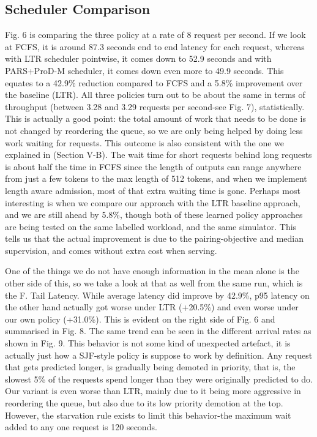 \documentclass[conference]{IEEEtran}
\begin{document}
\subsection{Scheduler Comparison}
\label{sec:comparison}
Fig. 6 is comparing the three policy at a rate of 8 request per second. If we look at FCFS, it is around 87.3 seconds end to end latency for each request, whereas with LTR scheduler pointwise, it comes down to 52.9 seconds and with PARS+ProD-M scheduler, it comes down even more to 49.9 seconds. This equates to a 42.9\% reduction compared to FCFS and a 5.8\% improvement over the baseline (LTR). All three policies turn out to be about the same in terms of throughput (between 3.28 and 3.29 requests per second-see Fig. 7), statistically. This is actually a good point: the total amount of work that needs to be done is not changed by reordering the queue, so we are only being helped by doing less work waiting for requests. This outcome is also consistent with the one we explained in (Section V-B). The wait time for short requests behind long requests is about half the time in FCFS since the length of outputs can range anywhere from just a few tokens to the max length of 512 tokens, and when we implement length aware admission, most of that extra waiting time is gone. Perhaps most interesting is when we compare our approach with the LTR baseline approach, and we are still ahead by 5.8\%, though both of these learned policy approaches are being tested on the same labelled workload, and the same simulator. This tells us that the actual improvement is due to the pairing-objective and median supervision, and comes without extra cost when serving.

One of the things we do not have enough information in the mean alone is the other side of this, so we take a look at that as well from the same run, which is the F. Tail Latency. While average latency did improve by 42.9\%, p95 latency on the other hand actually got worse under LTR (+20.5\%) and even worse under our own policy (+31.0\%). This is evident on the right side of Fig. 6 and summarised in Fig. 8. The same trend can be seen in the different arrival rates as shown in Fig. 9. This behavior is not some kind of unexpected artefact, it is actually just how a SJF-style policy is suppose to work by definition. Any request that gets predicted longer, is gradually being demoted in priority, that is, the slowest 5\% of the requests spend longer than they were originally predicted to do. Our variant is even worse than LTR, mainly due to it being more aggressive in reordering the queue, but also due to its low priority demotion at the top. However, the starvation rule exists to limit this behavior-the maximum wait added to any one request is 120 seconds.
\end{document}
